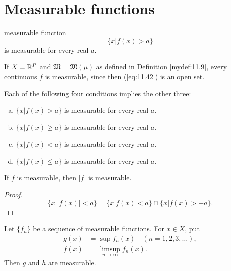 
\section{Measurable functions}

\begin{mydef}
    \label{mydef:11.13}
    measurable function
    \begin{equation}
        \label{eq:11.42}
        \{x|f(x) > a\}
    \end{equation}
    is measurable for every real $a$.
\end{mydef}

\begin{myExample}
    If $X = {\protect\mathbb R}^P$ and $\mathfrak{M} = \mathfrak{M}(\mu)$ 
    as defined in Definition \ref{mydef:11.9}, every continuous $f$ is measurable, since then (\ref{eq:11.42}) is an open set.
\end{myExample}

\begin{thm}
    \label{thm:11.15}
    Each of the following four conditions implies the other three:
    \begin{enumerate}[(a)]
        \item $\{x|f(x) >    a\}$ is measurable for every real $a$.
        \item $\{x|f(x) \geq a\}$ is measurable for every real $a$.
        \item $\{x|f(x) <    a\}$ is measurable for every real $a$.
        \item $\{x|f(x) \leq a\}$ is measurable for every real $a$.
    \end{enumerate}
\end{thm}

\begin{thm}
    \label{thm:11.16}
    If $f$ is measurable, then $\left| f \right|$ is measurable. 
\end{thm}

\begin{proof}
    \begin{equation*}
        \{x | \left| f(x) \right| < a\} = 
        \{x | f(x) <  a\} \cap 
        \{x | f(x) > -a\} .
    \end{equation*}
\end{proof}

\begin{thm}
    \label{thm:11.17}
    Let $\{f_n\}$ be a sequence of measurable functions. 
    For $x \in X$, put
    \begin{align*}
        g(x) &= \sup f_n(x) \quad (n=1,2,3,\dots), \\
        f(x) &= \limsup_{n \rightarrow \infty} f_n (x) .
    \end{align*}
    Then $g$ and $h$ are measurable.
\end{thm}

